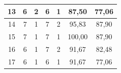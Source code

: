 \begin{table}[H]
\begin{tabular}{|ccccc|c|c|}
		\multicolumn{1}{|c|}{13}                                & \multicolumn{1}{c|}{6}                                                                          & \multicolumn{1}{c|}{2}                                                                          & \multicolumn{1}{c|}{6}                                                                          & 1                                                  & 87,50                                                & 77,06                                                     \\ \hline
		\multicolumn{1}{|c|}{14}                                & \multicolumn{1}{c|}{7}                                                                          & \multicolumn{1}{c|}{1}                                                                          & \multicolumn{1}{c|}{7}                                                                          & 2                                                  & 95,83                                                & 87,90                                                     \\ \hline
		\multicolumn{1}{|c|}{15}                                & \multicolumn{1}{c|}{7}                                                                          & \multicolumn{1}{c|}{1}                                                                          & \multicolumn{1}{c|}{7}                                                                          & 1                                                  & 100,00                                               & 87,90                                                     \\ \hline
		\multicolumn{1}{|c|}{16}                                & \multicolumn{1}{c|}{6}                                                                          & \multicolumn{1}{c|}{1}                                                                          & \multicolumn{1}{c|}{7}                                                                          & 2                                                  & 91,67                                                & 82,48                                                     \\ \hline
		\multicolumn{1}{|c|}{17}                                & \multicolumn{1}{c|}{6}                                                                          & \multicolumn{1}{c|}{1}                                                                          & \multicolumn{1}{c|}{6}                                                                          & 1                                                  & 91,67                                                & 77,06                                                     \\ \hline

\end{tabular}
\end{table}
